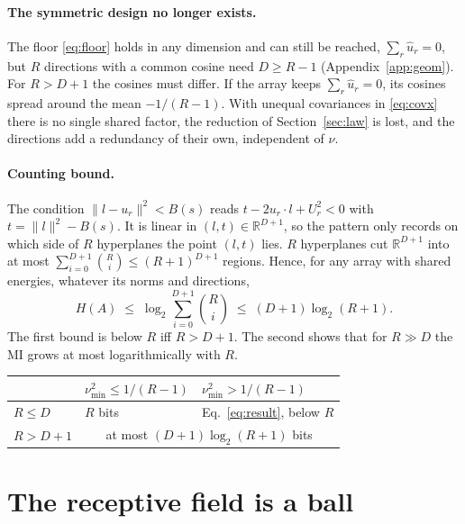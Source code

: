 \documentclass[11pt,a4paper]{article}
\newcommand{\RR}{\mathbb{R}}
\newcommand{\uhat}{\hat{u}}
\begin{document}
\paragraph{The symmetric design no longer exists.} The floor \eqref{eq:floor} holds in any
dimension and can still be reached, $\sum_r\uhat_r=0$, but $R$ directions with a common
cosine need $D\ge R-1$ (Appendix~\ref{app:geom}). For $R>D+1$ the cosines must differ. If
the array keeps $\sum_r\uhat_r=0$, its cosines spread around the mean $-1/(R-1)$. With
unequal covariances in \eqref{eq:covx} there is no single shared factor, the reduction of
Section~\ref{sec:law} is lost, and the directions add a redundancy of their own,
independent of $\nu$.

\paragraph{Counting bound.} The condition $\|l-u_r\|^2<B(s)$ reads $t-2u_r\cdot l+U_r^2<0$
with $t=\|l\|^2-B(s)$. It is linear in $(l,t)\in\RR^{D+1}$, so the pattern only records on
which side of $R$ hyperplanes the point $(l,t)$ lies. $R$ hyperplanes cut $\RR^{D+1}$ into
at most $\sum_{i=0}^{D+1}\binom Ri\le(R+1)^{D+1}$ regions. Hence, for any array with shared
energies, whatever its norms and directions,
\begin{equation}
  H(A)\;\le\;\log_2\sum_{i=0}^{D+1}\binom Ri\;\le\;(D+1)\log_2(R+1).
  \label{eq:count}
\end{equation}
The first bound is below $R$ iff $R>D+1$. The second shows that for $R\gg D$ the MI grows
at most logarithmically with $R$.

\begin{center}
\begin{tabular}{lll}
\toprule
 & $\nu_{\min}^2\le1/(R-1)$ & $\nu_{\min}^2>1/(R-1)$ \\
\midrule
$R\le D$ & $R$ bits & Eq.~\eqref{eq:result}, below $R$ \\
$R>D+1$ & \multicolumn{2}{c}{at most $(D+1)\log_2(R+1)$ bits} \\
\bottomrule
\end{tabular}
\end{center}

\appendix

\section{The receptive field is a ball}
\label{app:ball}
\end{document}
